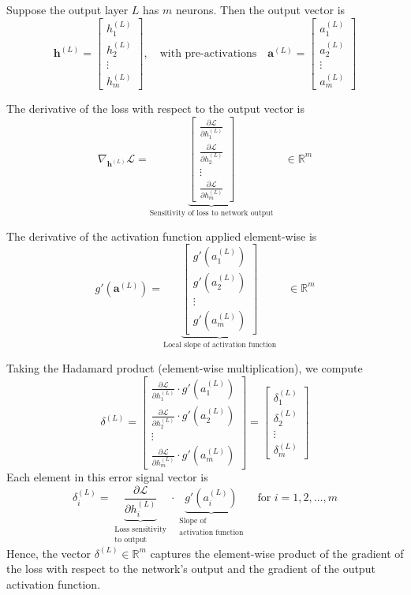 Suppose the output layer \( L \) has \( m \) neurons. Then the output vector is
\[
\mathbf{h}^{(L)} =
\begin{bmatrix}
h_1^{(L)} \\
h_2^{(L)} \\
\vdots \\
h_m^{(L)}
\end{bmatrix},
\quad \text{with pre-activations} \quad
\mathbf{a}^{(L)} =
\begin{bmatrix}
a_1^{(L)} \\
a_2^{(L)} \\
\vdots \\
a_m^{(L)}
\end{bmatrix}
\]

The derivative of the loss with respect to the output vector is
\[
\nabla_{\mathbf{h}^{(L)}} \mathcal{L} =
\underbrace{\begin{bmatrix}
\frac{\partial \mathcal{L}}{\partial h_1^{(L)}} \\
\frac{\partial \mathcal{L}}{\partial h_2^{(L)}} \\
\vdots \\
\frac{\partial \mathcal{L}}{\partial h_m^{(L)}}
\end{bmatrix}}_{\text{Sensitivity of loss to network output}}
\quad \in \mathbb{R}^{m}
\]

The derivative of the activation function applied element-wise is
\[
g'(\mathbf{a}^{(L)}) =
\underbrace{
\begin{bmatrix}
g'(a_1^{(L)}) \\
g'(a_2^{(L)}) \\
\vdots \\
g'(a_m^{(L)})
\end{bmatrix}}_{\text{Local slope of activation function}} \quad \in \mathbb{R}^{m}
\]

Taking the Hadamard product (element-wise multiplication), we compute
\[
\delta^{(L)} =
\begin{bmatrix}
\frac{\partial \mathcal{L}}{\partial h_1^{(L)}} \cdot g'(a_1^{(L)}) \\
\frac{\partial \mathcal{L}}{\partial h_2^{(L)}} \cdot g'(a_2^{(L)}) \\
\vdots \\
\frac{\partial \mathcal{L}}{\partial h_m^{(L)}} \cdot g'(a_m^{(L)})
\end{bmatrix}
=
\begin{bmatrix}
\delta_1^{(L)} \\
\delta_2^{(L)} \\
\vdots \\
\delta_m^{(L)}
\end{bmatrix}
\]
Each element in this error signal vector is
\[
\delta_i^{(L)} =
\underbrace{\frac{\partial \mathcal{L}}{\partial h_i^{(L)}}}_{\substack{\text{Loss sensitivity} \\ \text{to output}}}
\cdot
\underbrace{g'(a_i^{(L)})}_{\substack{\text{Slope of} \\ \text{activation function}}}
\quad \text{for } i = 1, 2, \dots, m
\]
Hence, the vector \( \delta^{(L)} \in \mathbb{R}^{m} \) captures the element-wise product of the gradient of the loss with respect to the network’s output and the gradient of the output activation function.

